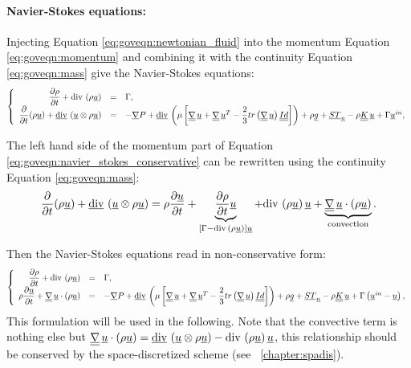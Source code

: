 \paragraph{Navier-Stokes equations:}
Injecting Equation \eqref{eq:goveqn:newtonian_fluid} into the momentum Equation \eqref{eq:goveqn:momentum} and combining
it with the continuity Equation \eqref{eq:goveqn:mass} give the Navier-Stokes equations:
%
\begin{equation}\label{eq:goveqn:navier_stokes_conservative}
\left\lbrace
\begin{array}{r c l}
\dfrac{\partial \rho}{\partial t} + \text{div}\, \left( \rho \underline{u} \right) &=& \Gamma, \\
\dfrac{\partial }{\partial t}(\rho \underline{u})
+\underline{\text{div}}\, \left( \underline{u}\otimes \rho \underline{u} \right)
&=& - \underline{\nabla} P
+ \underline{\text{div}}\, \left( \mu  \left[ \underline{\underline{{\nabla}}} \, \underline{u} + \underline{\underline{{\nabla}}} \, \underline{u}^T - \dfrac{2}{3} tr \left(\underline{\underline{{\nabla}}} \, \underline{u} \right) \underline{\underline{Id}} \right]   \right)
+\rho \underline{g}
 +\underline{ST}_{\underline{u}}-\rho\underline{\underline{K}}\,\underline{u} + \Gamma \underline{u}^{in},
\end{array}
\right.
\end{equation}

The left hand side of the momentum part of  Equation \eqref{eq:goveqn:navier_stokes_conservative} can be rewritten using the continuity Equation \eqref{eq:goveqn:mass}:
\begin{equation}\label{eq:goveqn:conservative_non_conservative}
\dfrac{\partial }{\partial t}(\rho \underline{u}) +\underline{\text{div}}\, \left( \underline{u}\otimes \rho \underline{u} \right)
 =
\rho \dfrac{\partial \underline{u}}{\partial t} +
\underbrace{
\dfrac{\partial \rho}{\partial t} \underline{u}
}_{
\left[ \Gamma  -  \text{div}\, \left(\rho \underline{u} \right) \right]  \underline{u}
}
+ \text{div}\, \left(\rho \underline{u} \right) \underline{u}
+
\underbrace{
\underline{\underline{{\nabla}}} \, \underline{u} \cdot \left( \rho \underline{u} \right)
}_{
\text{convection}
} .
\end{equation}

Then the Navier-Stokes equations read in non-conservative form:
\begin{equation}\label{eq:goveqn:navier_stokes_laminar}
\left\lbrace
\begin{array}{r c l}
\dfrac{\partial \rho}{\partial t} + \text{div}\, \left( \rho \underline{u} \right) &=& \Gamma, \\
\rho \dfrac{\partial \underline{u} }{\partial t}
+
\underline{\underline{{\nabla}}} \, \underline{u} \cdot \left( \rho \underline{u}\right)
&=& - \underline{\nabla} P
+ \underline{\text{div}}\, \left( \mu  \left[ \underline{\underline{{\nabla}}} \, \underline{u} + \underline{\underline{{\nabla}}} \, \underline{u}^T - \dfrac{2}{3} tr \left(\underline{\underline{{\nabla}}} \, \underline{u} \right) \underline{\underline{Id}} \right]   \right)
+ \rho \underline{g}
 +\underline{ST}_{\underline{u}}-\rho\underline{\underline{K}}\,\underline{u} + \Gamma \left( \underline{u}^{in} - \underline{u} \right),
\end{array}
\right.
\end{equation}
This formulation will be used in the following. Note that the convective term is nothing else but
$ \underline{\underline{{\nabla}}} \, \underline{u} \cdot \left( \rho \underline{u}\right) = \underline{\text{div}}\, \left( \underline{u}\otimes \rho \underline{u} \right) -\text{div}\, \left(  \rho \underline{u} \right) \underline{u} $,
this relationship should be conserved by the space-discretized scheme (see \chaptername~\ref{chapter:spadis}).

